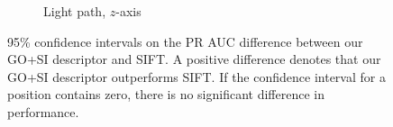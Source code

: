 \documentclass[thesis.tex]{subfiles}
\begin{document}
\begin{figure}[tb]
{\begin{subfigure}[t]{0.5618\textwidth}
		\caption{Light path, $z$-axis}
		\label{fig:dtuResultsStatszAxis}
	\end{subfigure}
	}
	\caption{95\% confidence intervals on the PR AUC difference between our GO+SI descriptor and SIFT. A positive difference denotes that our GO+SI descriptor outperforms SIFT. If the confidence interval for a position contains zero, there is no significant difference in performance.}
	\label{fig:dtuResultsStats}
\end{figure}
%
%
\subbibliography
\end{document}
